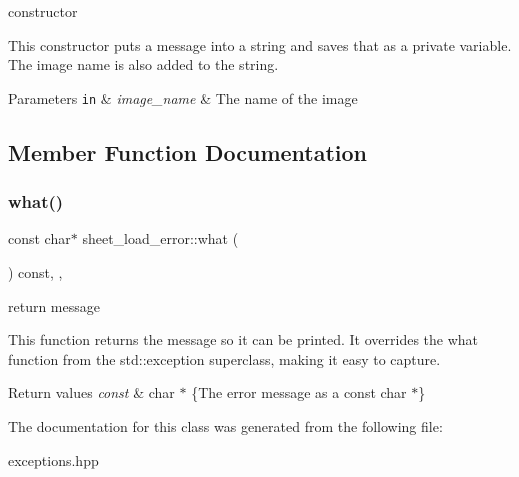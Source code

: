 constructor 

This constructor puts a message into a string and saves that as a private variable. The image name is also added to the string.


\begin{DoxyParams}[1]{Parameters}
\mbox{\tt in}  & {\em image\+\_\+name} & The name of the image \\
\hline
\end{DoxyParams}


\subsection{Member Function Documentation}
\mbox{\label{classsheet__load__error_a57dd1a273a0720e58ec0eb667d0c85aa}} 
\subsubsection{\texorpdfstring{what()}{what()}}
{\footnotesize\ttfamily const char$\ast$ sheet\+\_\+load\+\_\+error\+::what (\begin{DoxyParamCaption}{ }\end{DoxyParamCaption}) const\hspace{0.3cm}{\ttfamily [inline]}, {\ttfamily [override]}, {\ttfamily [noexcept]}}



return message 

This function returns the message so it can be printed. It overrides the what function from the std\+::exception superclass, making it easy to capture.


\begin{DoxyRetVals}{Return values}
{\em const} & char $\ast$ \{The error message as a const char $\ast$\} \\
\hline
\end{DoxyRetVals}


The documentation for this class was generated from the following file\+:\begin{DoxyCompactItemize}
\item 
exceptions.\+hpp\end{DoxyCompactItemize}
